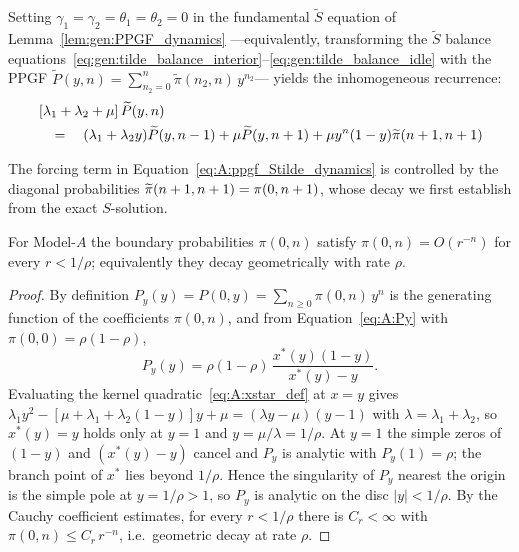 Setting $\gamma_1=\gamma_2=\theta_1=\theta_2=0$ in the fundamental $\widetilde{S}$
equation of Lemma~\ref{lem:gen:PPGF_dynamics} ---equivalently, transforming the
$\widetilde{S}$ balance
equations~\eqref{eq:gen:tilde_balance_interior}--\eqref{eq:gen:tilde_balance_idle}
with the PPGF $\widetilde{P}(y,n)=\sum_{n_2=0}^n \widetilde{\pi}(n_2,n)\,y^{n_2}$---
yields the inhomogeneous recurrence:
\begin{align}
    \begin{split}
       &\left[ \lambda_1 + \lambda_2 + \mu \right] \widetilde{P}(y,n) \\
       & \quad = \quad(\lambda_1 + \lambda_2 y) \widetilde{P}(y,n-1) + \mu \widetilde{P}(y,n+1)
                  + \mu y^n (1-y) \widetilde{\pi}(n+1,n+1)
    \end{split} \label{eq:A:ppgf_Stilde_dynamics}
\end{align}

The forcing term in Equation~\eqref{eq:A:ppgf_Stilde_dynamics} is controlled by the diagonal
probabilities $\widetilde{\pi}(n+1,n+1)=\pi(0,n+1)$, whose decay we first establish from the exact
$S$-solution.

\begin{lemma}\label{lem:A:diag_decay}
    For Model-$A$ the boundary probabilities $\pi(0,n)$ satisfy $\pi(0,n)=O(r^{-n})$ for
    every $r<1/\rho$; equivalently they decay geometrically with rate $\rho$.
\end{lemma}

\begin{proof}
    By definition $P_y(y)=P(0,y)=\sum_{n\ge0}\pi(0,n)\,y^n$ is the generating function of
    the coefficients $\pi(0,n)$, and from Equation~\eqref{eq:A:Py} with $\pi(0,0)=\rho(1-\rho)$,
    \begin{equation*}
        P_y(y)=\rho(1-\rho)\,\frac{x^*(y)(1-y)}{x^*(y)-y}.
    \end{equation*}
    Evaluating the kernel quadratic~\eqref{eq:A:xstar_def} at $x=y$ gives
    $\lambda_1 y^2-[\mu+\lambda_1+\lambda_2(1-y)]y+\mu=(\lambda y-\mu)(y-1)$ with
    $\lambda=\lambda_1+\lambda_2$, so $x^*(y)=y$ holds only at $y=1$ and $y=\mu/\lambda=1/\rho$.
    At $y=1$ the simple zeros of $(1-y)$ and $(x^*(y)-y)$ cancel and $P_y$ is analytic with
    $P_y(1)=\rho$; the branch point of $x^*$ lies beyond $1/\rho$. Hence the singularity of
    $P_y$ nearest the origin is the simple pole at $y=1/\rho>1$, so $P_y$ is analytic on the
    disc $|y|<1/\rho$. By the Cauchy coefficient estimates, for every $r<1/\rho$ there is
    $C_r<\infty$ with $\pi(0,n)\le C_r\,r^{-n}$, i.e.\ geometric decay at rate $\rho$.
\end{proof}

